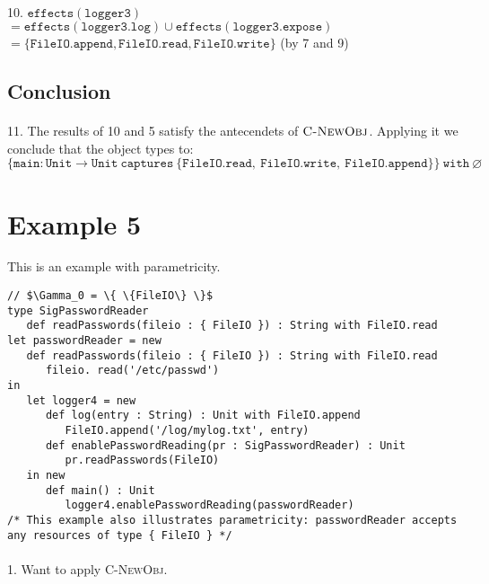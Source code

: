 \documentclass{llncs}
\newcommand{\keywadj}[1]{\mathtt{#1}}
\begin{document}
\paragraph{}
10. $\keywadj{effects(logger3)}$\\
$\keywadj{= effects(logger3.log) \cup effects(logger3.expose)}$\\
$\keywadj{= \{ FileIO.append, FileIO.read, FileIO.write \}}$ (by 7 and 9)

\subsection*{Conclusion}

\paragraph{}
11. The results of 10 and 5 satisfy the antecendets of $\textsc{C-NewObj}$. Applying it we conclude that the object types to: $\keywadj{\{main : Unit \rightarrow Unit~captures~\{FileIO.read,~FileIO.write,~FileIO.append\} \}~with~\varnothing}$

\section{Example 5}

This is an example with parametricity.

\vspace{-6pt}
\begin{lstlisting}[xleftmargin=20pt]
// $\Gamma_0 = \{ \{FileIO\} \}$
type SigPasswordReader
   def readPasswords(fileio : { FileIO }) : String with FileIO.read
let passwordReader = new
   def readPasswords(fileio : { FileIO }) : String with FileIO.read
      fileio. read('/etc/passwd')
in
   let logger4 = new
      def log(entry : String) : Unit with FileIO.append
         FileIO.append('/log/mylog.txt', entry)
      def enablePasswordReading(pr : SigPasswordReader) : Unit
         pr.readPasswords(FileIO)
   in new
      def main() : Unit
         logger4.enablePasswordReading(passwordReader)
/* This example also illustrates parametricity: passwordReader accepts any resources of type { FileIO } */
\end{lstlisting}

\paragraph{}
1. Want to apply \textsc{C-NewObj}.
\end{document}
